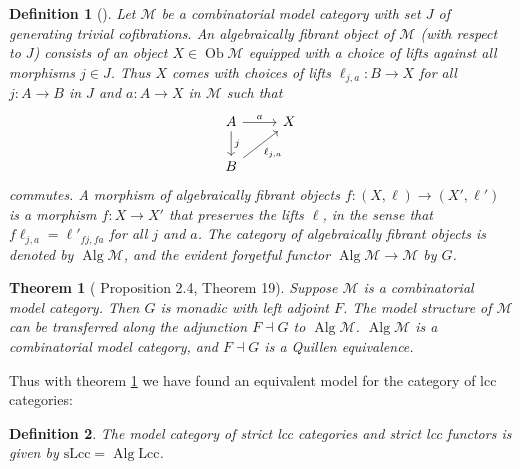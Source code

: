 \documentclass{article}
\newtheorem{theorem}{Theorem}
\newtheorem{definition}{Definition}
\begin{document}
\begin{definition}[\cite{algebraic-models}]
  Let $\mathcal{M}$ be a combinatorial model category with set $J$ of generating trivial cofibrations.
  An \emph{algebraically fibrant object} of $\mathcal{M}$ (with respect to $J$) consists of an object $X \in \operatorname{Ob} \mathcal{M}$ equipped with a choice of lifts against all morphisms $j \in J$.
  Thus $X$ comes with choices of lifts $\ell_{j, a} : B \rightarrow X$ for all $j : A \rightarrow B$ in $J$ and $a : A \rightarrow X$ in $\mathcal{M}$ such that
  \begin{equation}
    \begin{tikzcd}
      A \arrow[d, "j"] \arrow[r, "a"] & X \\
      B \arrow[ur, "{\ell_{j, a}}"']
    \end{tikzcd}
  \end{equation}
  commutes.
  A morphism of algebraically fibrant objects $f : (X, \ell) \rightarrow (X', \ell')$ is a morphism $f : X \rightarrow X'$ that preserves the lifts $\ell$, in the sense that $f\ell_{j, a} = \ell'_{fj, fa}$ for all $j$ and $a$.
  The category of algebraically fibrant objects is denoted by $\operatorname{Alg} \mathcal{M}$, and the evident forgetful functor $\operatorname{Alg} \mathcal{M} \rightarrow \mathcal{M}$ by $G$.
\end{definition}

\begin{theorem}[\cite{algebraic-models} Proposition 2.4, \cite{equipping-weak-equivalences} Theorem 19]
  \label{th:algebraically-fibrant-model-category}
  Suppose $\mathcal{M}$ is a combinatorial model category.
  Then $G$ is monadic with left adjoint $F$.
  The model structure of $\mathcal{M}$ can be transferred along the adjunction $F \dashv G$ to $\operatorname{Alg} \mathcal{M}$.
  $\operatorname{Alg} \mathcal{M}$ is a combinatorial model category, and $F \dashv G$ is a Quillen equivalence.
\end{theorem}

Thus with theorem \ref{th:algebraically-fibrant-model-category} we have found an equivalent model for the category of lcc categories:
\begin{definition}
  The model category of strict lcc categories and strict lcc functors is given by $\mathrm{sLcc} = \operatorname{Alg} \mathrm{Lcc}$.
\end{definition}
\end{document}
